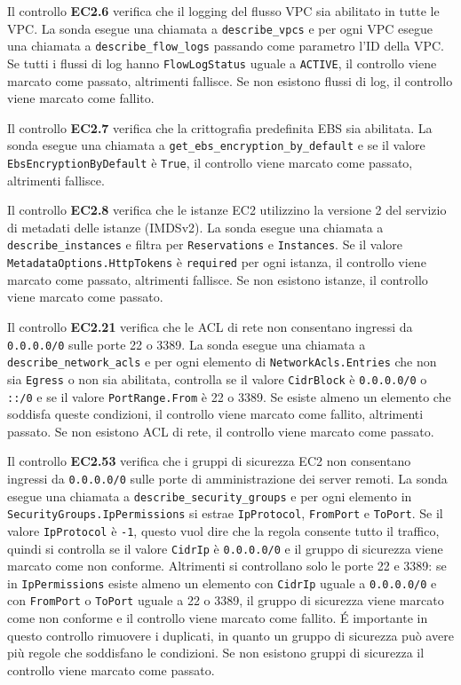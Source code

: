 Il controllo \textbf{EC2.6} verifica che il logging del flusso VPC sia abilitato in tutte le VPC. La sonda esegue una chiamata a \texttt{describe\_vpcs} e per ogni VPC esegue una chiamata a \texttt{describe\_flow\_logs} passando come parametro l'ID della VPC. Se tutti i flussi di log hanno \texttt{FlowLogStatus} uguale a \texttt{ACTIVE}, il controllo viene marcato come passato, altrimenti fallisce. Se non esistono flussi di log, il controllo viene marcato come fallito.

Il controllo \textbf{EC2.7} verifica che la crittografia predefinita EBS sia abilitata. La sonda esegue una chiamata a \texttt{get\_ebs\_encryption\_by\_default} e se il valore \texttt{EbsEncryptionByDefault} è \texttt{True}, il controllo viene marcato come passato, altrimenti fallisce.

Il controllo \textbf{EC2.8} verifica che le istanze EC2 utilizzino la versione 2 del servizio di metadati delle istanze (IMDSv2). La sonda esegue una chiamata a \texttt{describe\_instances} e filtra per \texttt{Reservations} e \texttt{Instances}. Se il valore \texttt{MetadataOptions.HttpTokens} è \texttt{required} per ogni istanza, il controllo viene marcato come passato, altrimenti fallisce. Se non esistono istanze, il controllo viene marcato come passato.

Il controllo \textbf{EC2.21} verifica che le ACL di rete non consentano ingressi da \texttt{0.0.0.0/0} sulle porte 22 o 3389. La sonda esegue una chiamata a \texttt{describe\_network\_acls} e per ogni elemento di \texttt{NetworkAcls.Entries} che non sia \texttt{Egress} o non sia abilitata, controlla se il valore \texttt{CidrBlock} è \texttt{0.0.0.0/0} o \texttt{::/0} e se il valore \texttt{PortRange.From} è 22 o 3389. Se esiste almeno un elemento che soddisfa queste condizioni, il controllo viene marcato come fallito, altrimenti passato. Se non esistono ACL di rete, il controllo viene marcato come passato.

Il controllo \textbf{EC2.53} verifica che i gruppi di sicurezza EC2 non consentano ingressi da \texttt{0.0.0.0/0} sulle porte di amministrazione dei server remoti. La sonda esegue una chiamata a \texttt{describe\_security\_groups} e per ogni elemento in \texttt{SecurityGroups.IpPermissions} si estrae \texttt{IpProtocol}, \texttt{FromPort} e \texttt{ToPort}. Se il valore \texttt{IpProtocol} è \texttt{-1}, questo vuol dire che la regola consente tutto il traffico, quindi si controlla se il valore \texttt{CidrIp} è \texttt{0.0.0.0/0} e il gruppo di sicurezza viene marcato come non conforme. Altrimenti si controllano solo le porte 22 e 3389: se in \texttt{IpPermissions} esiste almeno un elemento con \texttt{CidrIp} uguale a \texttt{0.0.0.0/0} e con \texttt{FromPort} o \texttt{ToPort} uguale a 22 o 3389, il gruppo di sicurezza viene marcato come non conforme e il controllo viene marcato come fallito. É importante in questo controllo rimuovere i duplicati, in quanto un gruppo di sicurezza può avere più regole che soddisfano le condizioni. Se non esistono gruppi di sicurezza il controllo viene marcato come passato.

